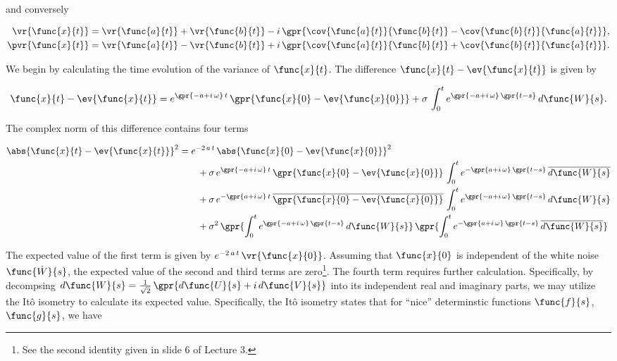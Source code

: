 and conversely

\begin{subequations}
	\begin{align}
		\vr{\func{x}{t}} &= \vr{\func{a}{t}} + \vr{\func{b}{t}} - i\,\gpr{\cov{\func{a}{t}}{\func{b}{t}} - \cov{\func{b}{t}}{\func{a}{t}}}, \\
		\pvr{\func{x}{t}} &= \vr{\func{a}{t}} - \vr{\func{b}{t}} + i\,\gpr{\cov{\func{a}{t}}{\func{b}{t}} + \cov{\func{b}{t}}{\func{a}{t}}}.
	\end{align}
\end{subequations}

We begin by calculating the time evolution of the variance of $\func{x}{t}$. The difference $\func{x}{t} - \ev{\func{x}{t}}$ is given by

\begin{equation}
	\func{x}{t} - \ev{\func{x}{t}} = e^{\gpr{-a + i\,\omega}\,t}\,\gpr{\func{x}{0} - \ev{\func{x}{0}}} + \sigma\,\int_{0}^{t} e^{\gpr{-a + i\,\omega}\,\gpr{t - s}}\,d\func{W}{s}.
\end{equation}

The complex norm of this difference contains four terms

\begin{align}
	\abs{\func{x}{t} - \ev{\func{x}{t}}}^2 &= e^{-2\,a\,t}\,\abs{\func{x}{0} - \ev{\func{x}{0}}}^2 \nonumber \\
			&\qquad + \sigma\,e^{\gpr{-a + i\,\omega}\,t}\,\gpr{\func{x}{0} - \ev{\func{x}{0}}}\,\int_{0}^{t} e^{-\gpr{a + i\,\omega}\,\gpr{t - s}}\,\overline{d\func{W}{s}} \nonumber \\
			&\qquad + \sigma\,e^{-\gpr{a + i\,\omega}\,t}\,\overline{\gpr{\func{x}{0} - \ev{\func{x}{0}}}}\,\int_{0}^{t} e^{\gpr{-a + i\,\omega}\,\gpr{t - s}}\,d\func{W}{s} \nonumber \\
			&\qquad + \sigma^2\,\gpr{\int_{0}^{t} e^{\gpr{-a + i\,\omega}\,\gpr{t - s}}\,d\func{W}{s}}\,\gpr{\int_{0}^{t} e^{-\gpr{a + i\,\omega}\,\gpr{t - s}}\,\overline{d\func{W}{s}}}
\end{align}

The expected value of the first term is given by $e^{-2\,a\,t}\,\vr{\func{x}{0}}$. Assuming that $\func{x}{0}$ is independent of the white noise $\func{\dot{W}}{s}$, the expected value of the second and third terms are zero\footnote{\label{fnt:int_against_dW}See the second identity given in slide 6 of Lecture 3.}. The fourth term requires further calculation. Specifically, by decompsing $d\func{W}{s} = \frac{1}{\sqrt{2}}\,\gpr{d\func{U}{s} + i\,d\func{V}{s}}$ into its independent real and imaginary parts, we may utilize the It\^{o} isometry to calculate its expected value. Specifically, the It\^{o} isometry states that for ``nice'' determinstic functions $\func{f}{s}$, $\func{g}{s}$, we have

